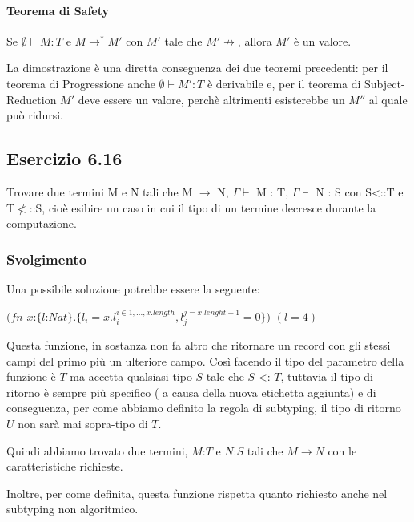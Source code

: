 \paragraph{Teorema di Safety}
\begin{centering}
	Se $\emptyset \vdash M :T$ e $M \to^* M'$ con $M'$ tale che $M' \not\to$, allora $M'$ \`e un valore.
\end{centering}

\noindent La dimostrazione \`e una diretta conseguenza dei due teoremi precedenti: per il teorema di Progressione anche $\emptyset \vdash M': T$ \`e derivabile e, per il teorema di Subject-Reduction $M'$ deve essere un valore, perch\`e altrimenti esisterebbe un $M''$ al quale pu\`o ridursi.


\subsection*{Esercizio 6.16}
Trovare due termini M e N tali che M $\rightarrow$ N, $\Gamma\vdash$ M : T, $\Gamma\vdash$ N : S con S<::T e T$\nless$::S, cio\`e esibire un caso in cui il tipo di un termine decresce durante la computazione. 
\subsubsection*{Svolgimento}
Una possibile soluzione potrebbe essere la seguente:

$ (fn$ $x$:$\{l$:$Nat\}.\{l_i = x.l_i^{i \in 1,...,x.length},l_j^{j=x.lenght+1} = 0\})$ $({l=4})$

Questa funzione, in sostanza non fa altro che ritornare un record con gli stessi campi del primo pi\`u un ulteriore campo.
Cos\`i facendo il tipo del parametro della funzione \`e $T$  ma accetta qualsiasi tipo $S$ tale che $S$ <: $T$, tuttavia il tipo di ritorno \`e sempre pi\`u specifico ( a causa della nuova etichetta aggiunta) e di conseguenza, per come abbiamo definito la regola di subtyping, il tipo di ritorno $U$ non sar\`a mai sopra-tipo di $T$.

Quindi abbiamo trovato due termini, $M$:$T$ e $N$:$S$ tali che $M \rightarrow N$ con le caratteristiche richieste.

Inoltre, per come definita, questa funzione rispetta quanto richiesto anche nel subtyping non algoritmico.